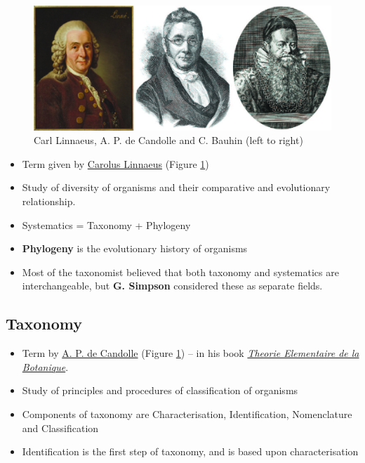 \documentclass[
]{book}
\providecommand{\tightlist}{%
  \setlength{\itemsep}{0pt}\setlength{\parskip}{0pt}}
\begin{document}
\begin{figure}
\centering
\includegraphics{images/workers.jpg}
\caption{\label{fig:fig1} Carl Linnaeus, A. P. de Candolle and C. Bauhin (left to right)}
\end{figure}

\begin{itemize}
\tightlist
\item
  Term given by \href{https://en.wikipedia.org/wiki/Carl_Linnaeus}{Carolus Linnaeus} (Figure \ref{fig:fig1})
\item
  Study of diversity of organisms and their comparative and evolutionary relationship.
\item
  Systematics = Taxonomy + Phylogeny
\item
  \textbf{Phylogeny} is the evolutionary history of organisms
\item
  Most of the taxonomist believed that both taxonomy and systematics are interchangeable, but \textbf{G. Simpson} considered these as separate fields.
\end{itemize}

\hypertarget{taxonomy}{%
\subsection{Taxonomy}\label{taxonomy}}

\begin{itemize}
\tightlist
\item
  Term by \href{https://en.wikipedia.org/wiki/Augustin_Pyramus_de_Candolle}{A. P. de Candolle} (Figure \ref{fig:fig1}) -- in his book \href{https://www.biodiversitylibrary.org/bibliography/39705}{\emph{Theorie Elementaire de la Botanique}}.
\item
  Study of principles and procedures of classification of organisms
\item
  Components of taxonomy are Characterisation, Identification, Nomenclature and Classification
\item
  Identification is the first step of taxonomy, and is based upon characterisation
\end{itemize}
\end{document}
